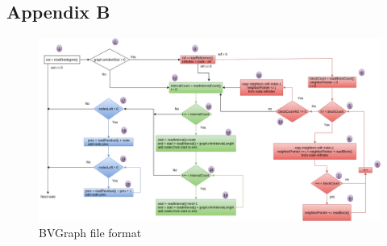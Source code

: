 \begin{landscape}
\chapter{Appendix B}

\begin{figure}[ht]
    \centering
    \includegraphics[scale=.45]{figure/BVGraph_format}
    \caption{BVGraph file format}
    \label{fig:BVGraphFormat}
\end{figure}

\end{landscape}